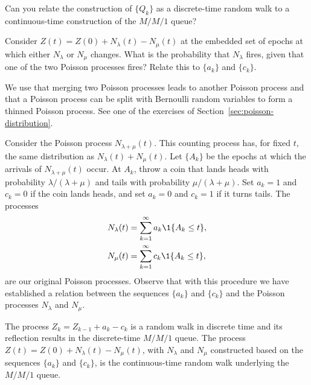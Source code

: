 \begin{exercise}
  Can you relate the construction of $\{Q_k\}$ as a discrete-time
  random walk to a continuous-time construction of the $M/M/1$ queue?

  \begin{hint}
Consider $Z(t)=Z(0) + N_\lambda( t) -N_\mu(t)$ at the embedded
    set of epochs at which either $N_\lambda$ or $N_\mu$ changes. What
    is the probability that $N_\lambda$ fires, given that one of the
    two Poisson processes fires? Relate this to $\{a_k\}$ and
    $\{c_k\}$.
  \end{hint}

    \begin{solution}
      We use that merging two Poisson processes leads to another
      Poisson process and that a Poisson process can be split with
      Bernoulli random variables to form a thinned Poisson
      process. See one of the exercises of
      Section~\ref{sec:poisson-distribution}. 

      Consider the Poisson process $N_{\lambda+\mu}(t)$. This counting
      process has, for fixed $t$, the same distribution as
      $N_\lambda(t)+N_\mu(t)$. Let $\{A_k\}$ be the epochs at which
      the arrivals of $N_{\lambda+\mu}(t)$ occur. At $A_k$, throw a
      coin that lands heads with probability $\lambda/(\lambda+\mu)$
      and tails with probability $\mu/(\lambda+\mu)$. Set $a_k=1$ and
      $c_k=0$ if the coin lands heads, and set $a_k=0$ and $c_k=1$ if
      it turns tails. The processes
      \begin{align*}
        N_\lambda(t) &= \sum_{k=1}^\infty a_k \1{A_k \leq t},\\
        N_\mu(t) &= \sum_{k=1}^\infty c_k \1{A_k \leq t},
      \end{align*}
      are our original Poisson processes.  Observe that with this
      procedure we have established a relation between the sequences
      $\{a_k\}$ and $\{c_k\}$ and the Poisson processes $N_\lambda$ and $N_\mu$. 

      The process $Z_k = Z_{k-1}+a_k - c_k$ is a random walk in
      discrete time and its reflection results in the discrete-time
      $M/M/1$ queue. The process
      $Z(t) = Z(0) + N_\lambda(t) - N_\mu(t)$, with $N_\lambda$ and
      $N_\mu$ constructed based on the sequences $\{a_k\}$ and
      $\{c_k\}$, is the continuous-time random walk underlying the
      $M/M/1$ queue.

    \end{solution}
\end{exercise}

